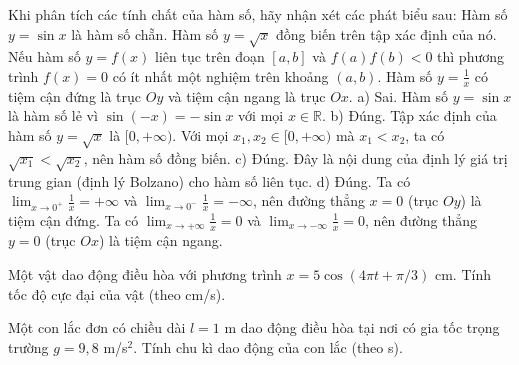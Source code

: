 \begin{ex}
Khi phân tích các tính chất của hàm số, hãy nhận xét các phát biểu sau:
\choiceTF
{Hàm số $y = \sin x$ là hàm số chẵn.}
{Hàm số $y = \sqrt{x}$ đồng biến trên tập xác định của nó.}
{Nếu hàm số $y=f(x)$ liên tục trên đoạn $[a,b]$ và $f(a)f(b) < 0$ thì phương trình $f(x)=0$ có ít nhất một nghiệm trên khoảng $(a,b)$.}
{Hàm số $y = \frac{1}{x}$ có tiệm cận đứng là trục $Oy$ và tiệm cận ngang là trục $Ox$.}
\loigiai
a) Sai. Hàm số $y = \sin x$ là hàm số lẻ vì $\sin(-x) = -\sin x$ với mọi $x \in \mathbb{R}$.
b) Đúng. Tập xác định của hàm số $y = \sqrt{x}$ là $[0, +\infty)$. Với mọi $x_1, x_2 \in [0, +\infty)$ mà $x_1 < x_2$, ta có $\sqrt{x_1} < \sqrt{x_2}$, nên hàm số đồng biến.
c) Đúng. Đây là nội dung của định lý giá trị trung gian (định lý Bolzano) cho hàm số liên tục.
d) Đúng. Ta có $\lim_{x \to 0^+} \frac{1}{x} = +\infty$ và $\lim_{x \to 0^-} \frac{1}{x} = -\infty$, nên đường thẳng $x=0$ (trục $Oy$) là tiệm cận đứng. Ta có $\lim_{x \to +\infty} \frac{1}{x} = 0$ và $\lim_{x \to -\infty} \frac{1}{x} = 0$, nên đường thẳng $y=0$ (trục $Ox$) là tiệm cận ngang.
\end{ex}

\begin{ex}
Một vật dao động điều hòa với phương trình $x = 5\cos(4\pi t + \pi/3)$ cm. Tính tốc độ cực đại của vật (theo cm/s).
\end{ex}

\begin{ex}
Một con lắc đơn có chiều dài $l = 1$ m dao động điều hòa tại nơi có gia tốc trọng trường $g = 9,8$ m/s$^2$. Tính chu kì dao động của con lắc (theo s).
\end{ex}

